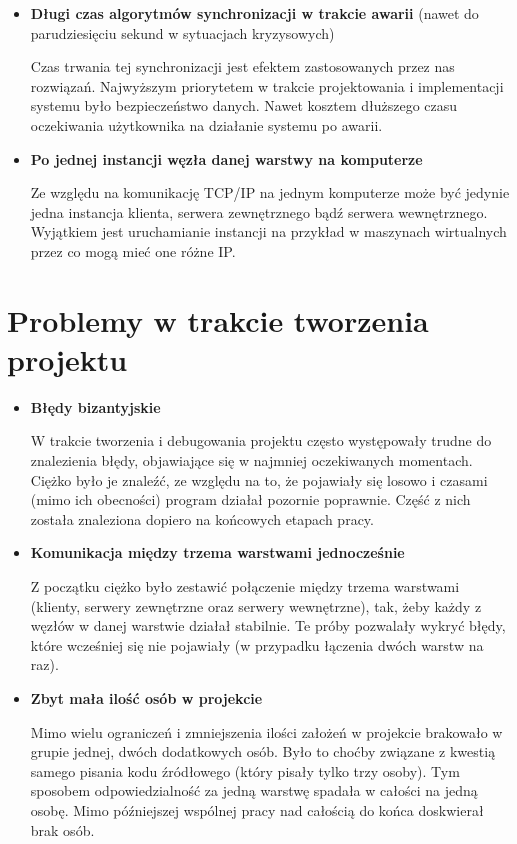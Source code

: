 {\begin{itemize}
\item \textbf{Długi czas algorytmów synchronizacji w trakcie awarii} (nawet do parudziesięciu sekund w sytuacjach kryzysowych)
\par{Czas trwania tej synchronizacji jest efektem zastosowanych przez nas rozwiązań. Najwyższym priorytetem w trakcie projektowania i implementacji systemu było bezpieczeństwo danych. Nawet kosztem dłuższego czasu oczekiwania użytkownika na działanie systemu po awarii.}

\item \textbf{Po jednej instancji węzła danej warstwy na komputerze}
\par{Ze względu na komunikację TCP/IP na jednym komputerze może być jedynie jedna instancja klienta, serwera zewnętrznego bądź serwera wewnętrznego. Wyjątkiem jest uruchamianie instancji na przykład w maszynach wirtualnych przez co mogą mieć one różne IP.}

\end{itemize}

\section[Problemy w trakcie tworzenia projektu]{Problemy w trakcie tworzenia projektu}
\begin{itemize}
\item \textbf{Błędy bizantyjskie}
\par{W trakcie tworzenia i debugowania projektu często występowały trudne do znalezienia błędy, objawiające się w najmniej oczekiwanych momentach. Ciężko było je znaleźć, ze względu na to, że pojawiały się losowo i czasami (mimo ich obecności) program działał pozornie poprawnie. Część z nich została znaleziona dopiero na końcowych etapach pracy.}
\item \textbf{Komunikacja między trzema warstwami jednocześnie}
\par{Z początku ciężko było zestawić połączenie między trzema warstwami (klienty, serwery zewnętrzne oraz serwery wewnętrzne), tak, żeby każdy z węzłów w danej warstwie działał stabilnie. Te próby pozwalały wykryć błędy, które wcześniej się nie pojawiały (w przypadku łączenia dwóch warstw na raz).}
\item \textbf{Zbyt mała ilość osób w projekcie}
\par{Mimo wielu ograniczeń i zmniejszenia ilości założeń w projekcie brakowało w grupie jednej, dwóch dodatkowych osób. Było to choćby związane z kwestią samego pisania kodu źródłowego (który pisały tylko trzy osoby). Tym sposobem odpowiedzialność za jedną warstwę spadała w całości na jedną osobę. Mimo późniejszej wspólnej pracy nad całością do końca doskwierał brak osób.}
\end{itemize}

}
